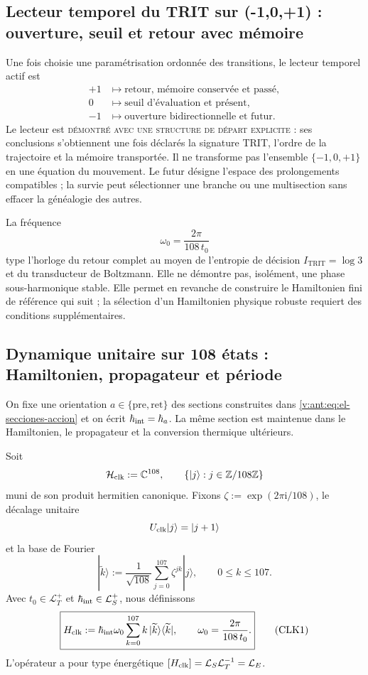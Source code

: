 \subsection{Lecteur temporel du TRIT sur ({-1,0,+1}) : ouverture, seuil et retour avec mémoire}
\label{v:rec:sec:lector-temporal-trit}

Une fois choisie une paramétrisation ordonnée des transitions, le lecteur
temporel actif est
\[
\begin{aligned}
 +1&\longmapsto
 \text{retour, mémoire conservée et passé},\\
 0&\longmapsto
 \text{seuil d’évaluation et présent},\\
 -1&\longmapsto
 \text{ouverture bidirectionnelle et futur}.
\end{aligned}
\]
Le lecteur est \textsc{démontré avec une structure de départ explicite} : ses
conclusions s’obtiennent une fois déclarés la signature TRIT, l’ordre de la
trajectoire et la mémoire transportée. Il ne transforme pas l’ensemble
\(\{-1,0,+1\}\) en une équation du mouvement. Le futur désigne l’espace
des prolongements compatibles ; la survie peut sélectionner une branche
ou une multisection sans effacer la généalogie des autres.

La fréquence
\[
 \omega_0=\frac{2\pi}{108\,t_0}
\]
type l’horloge du retour complet au moyen de l’entropie de décision
\(I_{\mathrm{TRIT}}=\log 3\) et du transducteur de Boltzmann.
Elle ne démontre pas, isolément, une phase sous-harmonique stable. Elle permet en revanche de construire le
Hamiltonien fini de référence qui suit ; la sélection d’un Hamiltonien
physique robuste requiert des conditions supplémentaires.

\subsection{Dynamique unitaire sur 108 états : Hamiltonien, propagateur et période}
\label{v:rec:sec:hamiltoniano-reloj-108}

On fixe une orientation \(a\in\{\mathrm{pre},\mathrm{ret}\}\) des
sections construites dans \eqref{v:ant:eq:el-secciones-accion} et on écrit
\(\hbar_{\rm int}=\hbar_a\). La même section est maintenue dans le
Hamiltonien, le propagateur et la conversion thermique ultérieurs.

Soit
\[
 \mathcal H_{\rm clk}:=\mathbb C^{108},
 \qquad
 \{|j\rangle:j\in\mathbb Z/108\mathbb Z\}
\]
muni de son produit hermitien canonique. Fixons
\(\zeta:=\exp(2\pi\mathrm i/108)\), le décalage unitaire
\[
 U_{\rm clk}|j\rangle=|j+1\rangle
\]
et la base de Fourier
\[
 |\widetilde k\rangle
 :=\frac1{\sqrt{108}}\sum_{j=0}^{107}\zeta^{jk}|j\rangle,
 \qquad 0\leq k\leq107.
\]
Avec \(t_0\in\mathcal L_T^+\) et
\(\hbar_{\rm int}\in\mathcal L_S^+\), nous définissons
\[
 \boxed{
 H_{\rm clk}
 :=\hbar_{\rm int}\omega_0
 \sum_{k=0}^{107}k\,
 |\widetilde k\rangle\langle\widetilde k|,
 \qquad
 \omega_0=\frac{2\pi}{108\,t_0}.}
 \tag{CLK1}\label{v:rec:eq:hamiltoniano-reloj-108}
\]
L’opérateur a pour type énergétique
\([H_{\rm clk}]=\mathcal L_S\mathcal L_T^{-1}=\mathcal L_E\).

